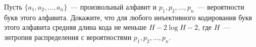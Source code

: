 Пусть $\{a_1, a_2, \dots, a_n\}$~--- произвольный алфавит и $p_1, p_2, \dots, p_n$~--- вероятности букв
этого алфавита. Докажите, что для любого инъективного кодирования букв этого алфавита средняя длина кода 
не меньше $H - 2 \log{H} - 2$, где $H$~--- энтропия распределения с вероятностями $p_1, p_2, \dots, p_n$.
